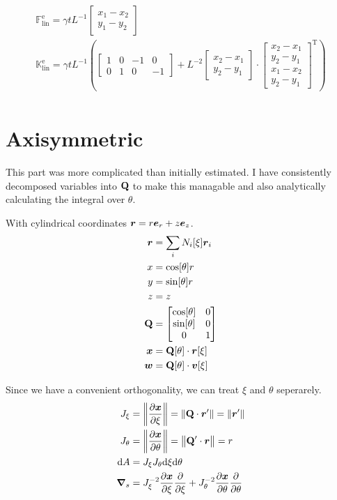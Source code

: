 \documentclass[a4paper,11pt]{article}
\renewcommand{\to}[1]{\text{\boldmath $#1$}} %
\newcommand{\ts}[1]{\text{\boldmath $\mathrm{#1}$}} %
\newcommand{\uv}[1]{\mathds{#1}}
\newcommand{\um}[1]{\mathds{#1}}
\newcommand{\intd}[1]{\mathrm{d}#1}
\newcommand{\pderiv}[2]{\frac{\partial#1}{\partial#2}}
\newcommand{\norm}[1]{\left\lVert{#1}\right\rVert}
\newcommand{\T}{\mathrm{T}}
\newcommand{\element}{\mathrm{e}}
\newcommand{\linear}{\mathrm{lin}}
\begin{document}
\begin{gather}
 \uv F^\element_\linear = \gamma t L^{-1} \begin{bmatrix}x_1-x_2\\y_1-y_2\end{bmatrix}\\
 \um K^\element_\linear = \gamma t L^{-1} \left(\begin{bmatrix}1&0&-1&0\\0&1&0&-1\end{bmatrix} + L^{-2} \begin{bmatrix}x_2-x_1\\y_2-y_1\end{bmatrix}\cdot\begin{bmatrix}x_2-x_1\\y_2-y_1\\x_1-x_2\\y_2-y_1\end{bmatrix}^\T\right)\\
\end{gather}

\section{Axisymmetric}
This part was more complicated than initially estimated.
I have consistently decomposed variables into $\ts Q$ to make this managable and also analytically calculating the integral over $\theta$.

With cylindrical coordinates $\to r = r\to e_r + z \to e_z$.
\begin{align}
 \to r &= \sum_i N_i[\xi]\to r_i\\
 x &= \cos[\theta] r\\
 y &= \sin[\theta] r\\
 z &= z\\
 \ts Q &= \begin{bmatrix}\cos[\theta] & 0\\ \sin[\theta] & 0\\ 0 & 1\end{bmatrix}\\
 \to x &= \ts Q[\theta] \cdot \to r[\xi]\\
 \to w &= \ts Q[\theta] \cdot \to v[\xi]
\end{align}

Since we have a convenient orthogonality, we can treat $\xi$ and $\theta$ seperarely.
\begin{align}
 J_\xi &= \norm{\pderiv{\to x}{\xi}} = \norm{\ts Q \cdot \to r'} = \norm{\to r'}\\
 J_\theta &= \norm{\pderiv{\to x}{\theta}} = \norm{\ts Q' \cdot \to r} = r \\
 \intd A &= J_\xi J_\theta \intd \xi \intd \theta \\
 \to\nabla_s &= J_\xi^{-2} \pderiv{\to x}{\xi}\pderiv{}{\xi} + J_\theta^{-2} \pderiv{\to x}{\theta}\pderiv{}{\theta}
\end{align}
\end{document}
